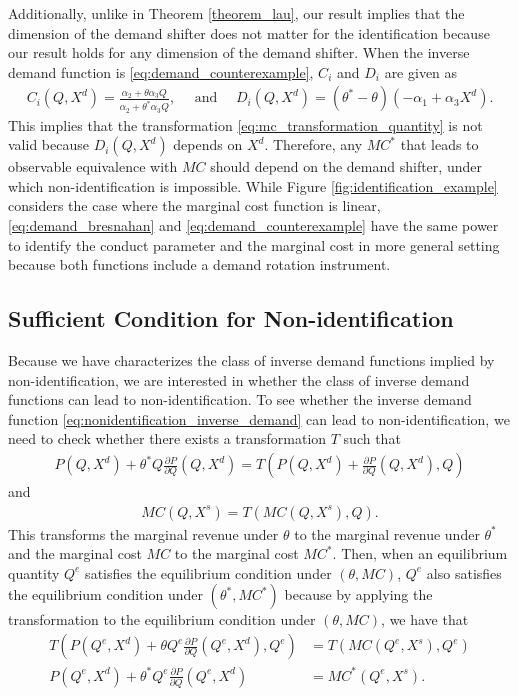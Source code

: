 \documentclass[11pt, a4paper]{article}
\theoremstyle{remark}
\begin{document}
Additionally, unlike in Theorem \ref{theorem_lau}, our result implies that the dimension of the demand shifter does not matter for the identification because our result holds for any dimension of the demand shifter.
When the inverse demand function is \eqref{eq:demand_counterexample}, $C_i$ and $D_i$ are given as
\begin{align}
    C_i(Q, X^{d}) = \frac{\alpha_2 + \theta\alpha_3Q}{\alpha_2 + \theta^{*}\alpha_3Q},\quad \text{ and }\quad  D_i(Q, X^{d}) =  (\theta^{*} - \theta)(-\alpha_1 + \alpha_3X^{d}).
\end{align}
This implies that the transformation \eqref{eq:mc_transformation_quantity} is not valid because $D_i(Q, X^{d})$ depends on $X^{d}$.
Therefore, any $MC^{*}$ that leads to observable equivalence with $MC$ should depend on the demand shifter, under which non-identification is impossible.
While Figure \ref{fig:identification_example} considers the case where the marginal cost function is linear, \eqref{eq:demand_bresnahan} and \eqref{eq:demand_counterexample} have the same power to identify the conduct parameter and the marginal cost in more general setting because both functions include a demand rotation instrument.



\subsection{Sufficient Condition for Non-identification}
Because we have characterizes the class of inverse demand functions implied by non-identification, we are interested in whether the class of inverse demand functions can lead to non-identification.
To see whether the inverse demand function \eqref{eq:nonidentification_inverse_demand} can lead to non-identification, we need to check whether there exists a transformation $T$ such that
\begin{align}
    P(Q, X^{d}) + \theta^{*} Q \frac{\partial P}{\partial Q}(Q, X^{d}) = T\left(P(Q, X^{d}) + \frac{\partial P}{\partial Q}(Q, X^{d}), Q\right)
\end{align}
and
\begin{align}
    MC(Q, X^{s}) = T\left(MC(Q, X^{s}), Q\right).
\end{align}
This transforms the marginal revenue under $\theta$ to the marginal revenue under $\theta^{*}$ and the marginal cost $MC$ to the marginal cost $MC^{*}$.
Then, when an equilibrium quantity $Q^e$ satisfies the equilibrium condition under $(\theta, MC)$, $Q^e$ also satisfies the equilibrium condition under $(\theta^{*}, MC^{*})$ because by applying the transformation to the equilibrium condition under $(\theta, MC)$, we have that
\begin{align}
    T\left(P(Q^e, X^{d}) + \theta Q^e \frac{\partial P}{\partial Q}(Q^e, X^{d}), Q^e\right)&= T\left(MC(Q^e, X^{s}), Q^e\right)\\
    P(Q^e, X^{d}) + \theta^{*} Q^e \frac{\partial P}{\partial Q}(Q^e, X^{d})&= MC^{*}(Q^e, X^{s}).
\end{align}
\end{document}
